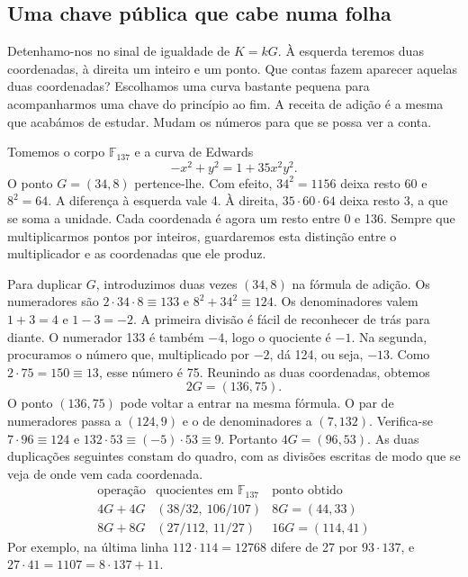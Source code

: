 \subsection{Uma chave pública que cabe numa folha}
\label{sec:curva-137}

Detenhamo-nos no sinal de igualdade de \(K=kG\). À esquerda teremos
duas coordenadas, à direita um inteiro e um ponto. Que contas fazem
aparecer aquelas duas coordenadas? Escolhamos uma curva bastante
pequena para acompanharmos uma chave do princípio ao fim. A receita
de adição é a mesma que acabámos de estudar. Mudam os números para
que se possa ver a conta.

Tomemos o corpo \(\mathbb F_{137}\) e a curva de Edwards
\[
             -x^2+y^2=1+35x^2y^2 .
\]
O ponto \(G=(34,8)\) pertence-lhe. Com efeito, \(34^2=1156\)
deixa resto 60 e \(8^2=64\). A diferença à esquerda vale 4.
À direita, \(35\cdot60\cdot64\) deixa resto 3, a que se soma a
unidade. Cada coordenada é agora um resto entre 0 e 136.
Sempre que multiplicarmos pontos por inteiros, guardaremos esta
distinção entre o multiplicador e as coordenadas que ele produz.

Para duplicar \(G\), introduzimos duas vezes \((34,8)\) na fórmula
de adição. Os numeradores são \(2\cdot34\cdot8\equiv133\) e
\(8^2+34^2\equiv124\). Os denominadores valem \(1+3=4\) e
\(1-3=-2\). A primeira divisão é fácil de reconhecer de trás para
diante. O numerador 133 é também \(-4\), logo o quociente é \(-1\).
Na segunda, procuramos o número que, multiplicado por \(-2\), dá
124, ou seja, \(-13\). Como \(2\cdot75=150\equiv13\), esse número
é 75. Reunindo as duas coordenadas, obtemos
\[
                        2G=(136,75).
\]
O ponto \((136,75)\) pode voltar a entrar na mesma fórmula. O par de
numeradores passa a \((124,9)\) e o de denominadores a \((7,132)\).
Verifica-se \(7\cdot96\equiv124\) e
\(132\cdot53\equiv(-5)\cdot53\equiv9\). Portanto
\(4G=(96,53)\). As duas duplicações seguintes constam do quadro, com
as divisões escritas de modo que se veja de onde vem cada coordenada.
\[
\begin{array}{c|c|c}
\text{operação}&\text{quocientes em }\mathbb F_{137}&\text{ponto obtido}\\ \hline
4G+4G&(38/32,\ 106/107)&8G=(44,33)\\
8G+8G&(27/112,\ 11/27)&16G=(114,41)
\end{array}
\]
Por exemplo, na última linha \(112\cdot114=12768\) difere de 27
por \(93\cdot137\), e \(27\cdot41=1107=8\cdot137+11\).


